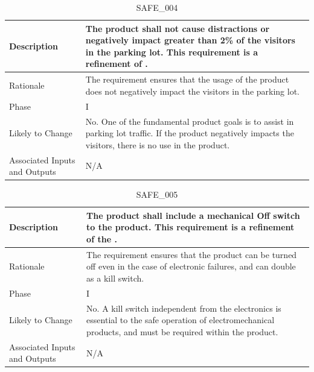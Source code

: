\documentclass{article}
\begin{document}
\begin{table}[!h]
\begin{center}
\caption {SAFE\_004} 
\label{SAFE_004}
\begin{tabular}{ | m{3cm} | m{11cm} | }
\hline
Description & The product shall not cause distractions or negatively impact greater than 2\% of the visitors in the parking lot. This requirement is a refinement of \nameref{SAFE_001}. \\
\hline
Rationale & The requirement ensures that the usage of the product does not negatively impact the visitors in the parking lot.  \\
\hline
Phase & I \\
\hline
Likely to Change & No. One of the fundamental product goals is to assist in parking lot traffic. If the product negatively impacts the visitors, there is no use in the product. \\
\hline
Associated Inputs and Outputs & N/A \\
\hline
\end{tabular}
\end{center}
\end{table}

\begin{table}[!h]
\begin{center}
\caption {SAFE\_005} 
\label{SAFE_005}
\begin{tabular}{ | m{3cm} | m{11cm} | }
\hline
Description & The product shall include a mechanical Off switch to the product. This requirement is a refinement of the \nameref{Off State}.  \\
\hline
Rationale & The requirement ensures that the product can be turned off even in the case of electronic failures, and can double as a kill switch.  \\
\hline
Phase & I \\
\hline
Likely to Change & No. A kill switch independent from the electronics is essential to the safe operation of electromechanical products, and must be required within the product. \\
\hline
Associated Inputs and Outputs & N/A \\
\hline
\end{tabular}
\end{center}
\end{table}

\clearpage
\newpage
\end{document}
